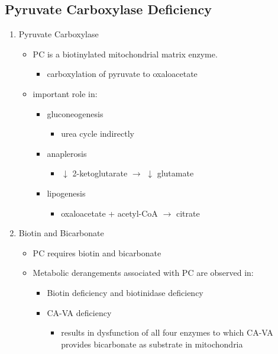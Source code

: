 \documentclass{scrartcl}
\begin{document}
\subsection{Pyruvate Carboxylase Deficiency}
\label{sec:orgda995ac}
\begin{enumerate}
\item Pyruvate Carboxylase
\label{sec:org3fd35de}

\begin{itemize}
\item PC is a biotinylated mitochondrial matrix enzyme.
\begin{itemize}
\item carboxylation of pyruvate to oxaloacetate
\end{itemize}


\item important role in:
\begin{itemize}
\item gluconeogenesis
\begin{itemize}
\item urea cycle indirectly
\end{itemize}
\item anaplerosis
\begin{itemize}
\item \(\downarrow\) 2-ketoglutarate \(\to\) \(\downarrow\) glutamate
\end{itemize}
\item lipogenesis
\begin{itemize}
\item oxaloacetate + acetyl-CoA \(\to\) citrate
\end{itemize}
\end{itemize}
\end{itemize}

\item Biotin and Bicarbonate
\label{sec:orgb336666}
\begin{itemize}
\item PC requires biotin and bicarbonate
\item Metabolic derangements associated with PC are observed in:
\begin{itemize}
\item Biotin deficiency and biotinidase deficiency

\item CA-VA deficiency
\begin{itemize}
\item results in dysfunction of all four enzymes to which CA-VA
provides bicarbonate as substrate in mitochondria
\end{itemize}


\end{itemize}
\end{itemize}
\end{enumerate}
\end{document}
